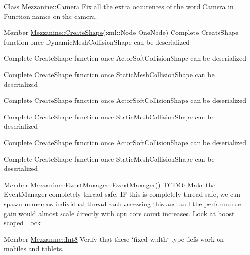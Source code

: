 \label{todo__todo000004}
\hypertarget{todo__todo000004}{}
 
\begin{DoxyDescription}
\item[Class \hyperlink{classMezzanine_1_1Camera}{Mezzanine::Camera} ]Fix all the extra occurences of the word Camera in Function names on the camera. 
\end{DoxyDescription}

\label{todo__todo000007}
\hypertarget{todo__todo000007}{}
 
\begin{DoxyDescription}
\item[Member \hyperlink{namespaceMezzanine_a3b5904fe847274e3bd0d6a1b39cbed02}{Mezzanine::CreateShape}(xml::Node OneNode) ]Complete CreateShape function once DynamicMeshCollisionShape can be deserialized 

Complete CreateShape function once ActorSoftCollisionShape can be deserialized 

Complete CreateShape function once StaticMeshCollisionShape can be deserialized 

Complete CreateShape function once ActorSoftCollisionShape can be deserialized 

Complete CreateShape function once StaticMeshCollisionShape can be deserialized 

Complete CreateShape function once ActorSoftCollisionShape can be deserialized 

Complete CreateShape function once StaticMeshCollisionShape can be deserialized 
\end{DoxyDescription}

\label{todo__todo000014}
\hypertarget{todo__todo000014}{}
 
\begin{DoxyDescription}
\item[Member \hyperlink{classMezzanine_1_1EventManager_a95ce9d2d865b0d8d9468448969b0ade2}{Mezzanine::EventManager::EventManager}() ]TODO: Make the EventManager completely thread safe. IF this is completely thread safe, we can spawn numerous individual thread each accessing this and and the performance gain would almost scale directly with cpu core count increases. Look at boost scoped\_\-lock 
\end{DoxyDescription}

\label{todo__todo000012}
\hypertarget{todo__todo000012}{}
 
\begin{DoxyDescription}
\item[Member \hyperlink{namespaceMezzanine_acbb048ee99aa07566d5a6eb33f5a2c2d}{Mezzanine::Int8} ]Verify that these \char`\"{}fixed-\/width\char`\"{} type-\/defs work on mobiles and tablets.


\end{DoxyDescription}

